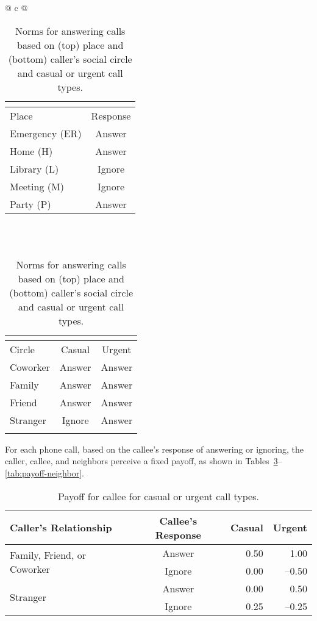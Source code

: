 \begin{table}[!tb]
\centering

\caption[Norms for answering calls]{Norms for answering calls based on (top) place and (bottom) caller's social circle and casual or urgent call types.}
\label{tab:norms-place}

\begin{tabular}{@{} c @{}}

\begin{tabular}{@{~~}l@{~} c@{}}
\multicolumn{2}{c}{\fbf{Norms by place}}\\
\toprule
Place & Response\\\midrule
Emergency (ER) &Answer\\
Home (H) & Answer \\
Library (L) &Ignore\\
Meeting (M) &Ignore\\
Party (P) &Answer\\
\bottomrule
\end{tabular}
\\
\\
\begin{tabular}{@{}l @{~} c@{~} c@{~~}}
\multicolumn{3}{c}{\fbf{Norms by circle and call type}}\\
\toprule
Circle & Casual & Urgent\\
\midrule
Coworker&Answer&Answer\\
Family&Answer&Answer\\
Friend&Answer&Answer\\
Stranger&Ignore&Answer\\
\bottomrule
\\
\end{tabular}
\end{tabular}
\end{table}

For each phone call, based on the callee's response of answering or ignoring, the caller, callee, and neighbors perceive a fixed payoff, as shown in Tables~\ref{tab:payoff-callee}--\ref{tab:payoff-neighbor}. 


\begin{table}[!tb]
\centering

\caption[Payoff for callee]{Payoff for callee for casual or urgent call types.}
\label{tab:payoff-callee}


\begin{tabular}{@{}lcrr@{}}
\toprule
Caller's Relationship & Callee's Response & Casual & Urgent\\\midrule
\multirow{2}{2.8cm}{Family, Friend, or Coworker}&Answer&0.50&1.00\\
&Ignore&0.00&--0.50\\\midrule
\multirow{2}{2.8cm}{Stranger}&Answer&0.00&0.50\\
&Ignore&0.25&--0.25\\
\bottomrule
\end{tabular}


\end{table}

